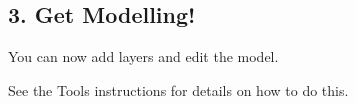 \documentclass[a4paper,10pt,english]{sphinxmanual}
\begin{document}
\subsection{3. Get Modelling!}
\label{\detokenize{getting_started:get-modelling}}
You can now add layers and edit the model.

See the Tools instructions for details on how to do this.


\section{}
\label{\detokenize{manual:gui-manual}}\label{\detokenize{manual:manual}}\label{\detokenize{manual::doc}}

\subsection{}
\label{\detokenize{manual_icons:icons}}\label{\detokenize{manual_icons:icon-shortcuts}}\label{\detokenize{manual_icons::doc}}
\end{document}
